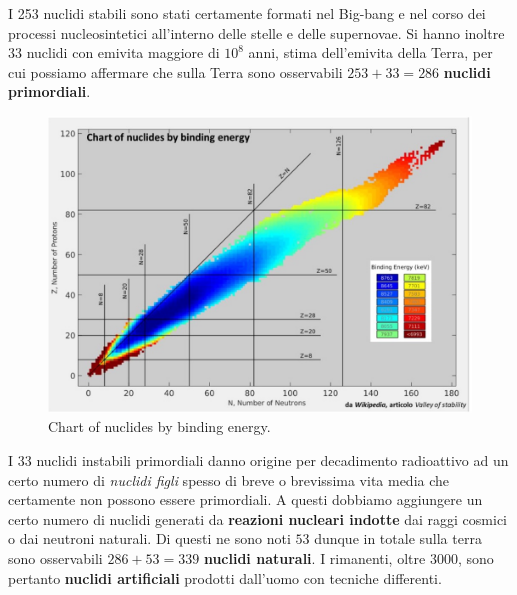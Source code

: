 I 253 nuclidi stabili sono stati certamente formati nel Big-bang e nel corso dei processi nucleosintetici all’interno
delle stelle e delle supernovae.
Si hanno inoltre $33$ nuclidi con emivita maggiore di $ {10}^{8}$ anni, stima dell'emivita della Terra, per cui possiamo
affermare che sulla Terra sono osservabili $253+33=286$ \textbf{nuclidi primordiali}.
\begin{figure}
    \centering
    \includegraphics{../figs/nuclides-chart-binding-energy}
    \caption{Chart of nuclides by binding energy.}
    \label{fig:nuclides-chart-binding-energy}
\end{figure}
I $33$ nuclidi instabili primordiali danno origine per decadimento radioattivo ad un certo numero di \emph{nuclidi figli}
spesso di breve o brevissima vita media che certamente non possono essere primordiali.
A questi dobbiamo aggiungere un certo numero di nuclidi generati da \textbf{reazioni nucleari indotte} dai raggi cosmici o dai neutroni naturali.
Di questi ne sono noti $53$ dunque in totale sulla terra sono osservabili $286+53=339$ \textbf{nuclidi naturali}.
I rimanenti, oltre $3000$, sono pertanto \textbf{nuclidi artificiali} prodotti dall’uomo con tecniche differenti.

